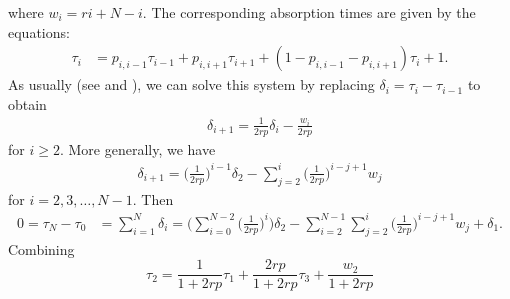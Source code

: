 \documentclass[a4paper,english,10pt]{amsart}
\theoremstyle{definition}
\numberwithin{equation}{section}
\begin{document}
where $w_i = ri + N - i$.
The corresponding absorption times are given by the equations:
\begin{align} \label{eq:AT_eq_cycle}
\tau_i  & = p_{i,i-1} \tau_{i-1} + p_{i,i+1} \tau_{i+1}+ (1 -  p_{i,i-1} -  p_{i,i+1}) \tau_i + 1.
\end{align}
As usually (see \cite{H} and \cite{AGSL}), we can solve this system by replacing
$\delta_i = \tau_i - \tau_{i-1}$
to obtain
\begin{align} \label{eq:ATsubs:cycle1}
\delta_{i+1} = \frac{1}{2rp}\delta_i -  \frac{w_i}{2rp}
\end{align}
for $i \geq 2$. More generally, we have 
\begin{align} \label{eq:ATsubs:cycle}
\delta_{i+1} = \big(\frac{1}{2rp}\big)^{i-1}\delta_2 - \sum_{j=2}^i
\big(\frac{1}{2rp}\big)^{i-j+1}w_j
\end{align}
for $i=2,3, \ldots , N-1$. Then
\begin{align} \label{eq:ATcycle1}
0 = \tau_N - \tau_0  & = \sum_{i=1}^N \delta_i  = \Big( \sum_{i=0}^{N-2} \big(\frac{1}{2rp}\big)^i \Big) \delta_2  -  \sum_{i=2}^{N-1} \sum_{j=2}^i \big(\frac{1}{2rp}\big)^{i-j+1}w_j + \delta_1.
\end{align}
Combining
$$
\tau_2 = \frac{1}{1+2rp} \tau_1 + \frac{2rp}{1+2rp}  \tau_3 + \frac{w_2}{1+2rp} 
$$
\end{document}
